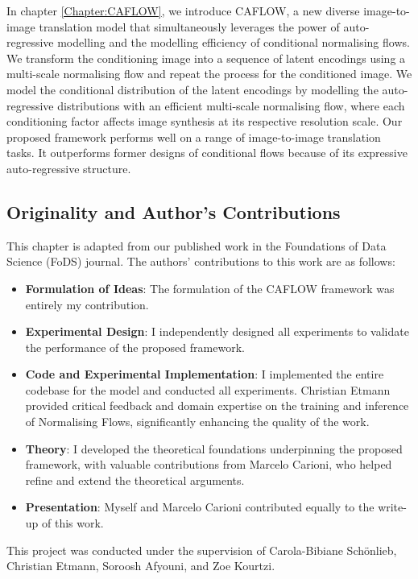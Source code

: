 In chapter \ref{Chapter:CAFLOW}, we introduce CAFLOW, a new diverse image-to-image translation model that simultaneously leverages the power of auto-regressive modelling and the modelling efficiency of conditional normalising flows. We transform the conditioning image into a sequence of latent encodings using a multi-scale normalising flow and repeat the process for the conditioned image. We model the conditional distribution of the latent encodings by modelling the auto-regressive distributions with an efficient multi-scale normalising flow, where each conditioning factor affects image synthesis at its respective resolution scale. Our proposed framework performs well on a range of image-to-image translation tasks. It outperforms former designs of conditional flows because of its expressive auto-regressive structure.


\subsection*{Originality and Author’s Contributions}

This chapter is adapted from our published work \cite{batzolis2024caflow} in the Foundations of Data Science (FoDS) journal. The authors' contributions to this work are as follows:

\begin{itemize}
\item \textbf{Formulation of Ideas}: The formulation of the CAFLOW framework was entirely my contribution.
\item \textbf{Experimental Design}: I independently designed all experiments to validate the performance of the proposed framework.
\item \textbf{Code and Experimental Implementation}: I implemented the entire codebase for the model and conducted all experiments. Christian Etmann provided critical feedback and domain expertise on the training and inference of Normalising Flows, significantly enhancing the quality of the work.
\item \textbf{Theory}: I developed the theoretical foundations underpinning the proposed framework, with valuable contributions from Marcelo Carioni, who helped refine and extend the theoretical arguments.
\item \textbf{Presentation}: Myself and Marcelo Carioni contributed equally to the write-up of this work.
\end{itemize}

This project was conducted under the supervision of Carola-Bibiane Sch\"onlieb, Christian Etmann, Soroosh Afyouni, and Zoe Kourtzi. 


